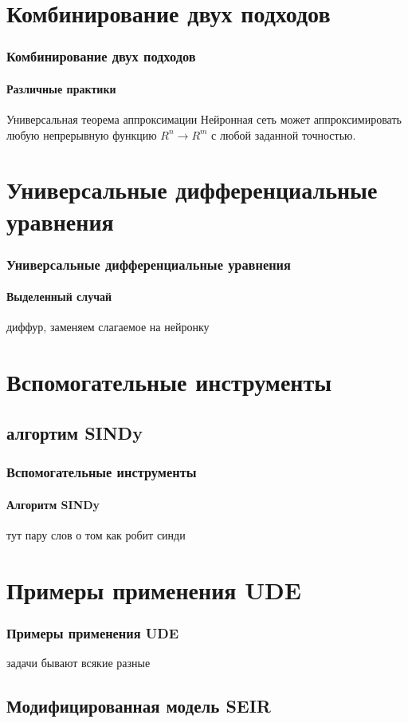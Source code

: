 \documentclass[10pt,pdf,hyperref={unicode}]{beamer}
\begin{document}
			
	\section{Комбинирование двух подходов}
		
		\begin{frame}
			\frametitle{Комбинирование двух подходов} 
			\framesubtitle{Различные практики}
				\begin{block}{Универсальная теорема аппроксимации}
					Нейронная сеть может аппроксимировать любую непрерывную функцию $R^n \to R^m$ с любой заданной точностью.
				\end{block}  
		\end{frame}
		
		
	\section{Универсальные дифференциальные уравнения}
	
		\begin{frame}
			\frametitle{Универсальные дифференциальные уравнения} 
			\framesubtitle{Выделенный случай}
				диффур, заменяем слагаемое на нейронку 
		\end{frame}
	
	
	\section{Вспомогательные инструменты}
	
		\subsection{алгортим SINDy}
		
			\begin{frame}
				\frametitle{Вспомогательные инструменты} 
				\framesubtitle{Алгоритм SINDy}
					тут пару слов о том как робит синди  
			\end{frame}
		
		
	\section{Примеры применения UDE}
	
		\begin{frame}
			\frametitle{Примеры применения UDE} 
				задачи бывают всякие разные  
		\end{frame}
	
		
		\subsection{Модифицированная модель SEIR}
		
\end{document}
